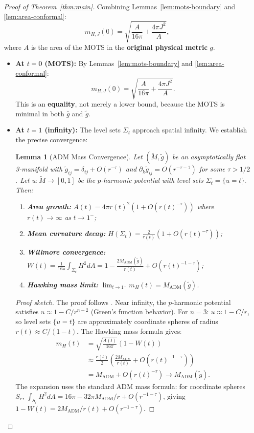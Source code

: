 \documentclass[12pt]{article}
\theoremstyle{plain}
\newtheorem{lemma}[theorem]{Lemma}
\theoremstyle{definition}
\theoremstyle{remark}
\newcommand{\ADM}{\mathrm{ADM}}
\newcommand{\tM}{\tilde{M}}
\newcommand{\tg}{\tilde{g}}
\newcommand{\bg}{\bar{g}}
\begin{document}
\begin{proof}[Proof of Theorem~\ref{thm:main}]
Combining Lemmas~\ref{lem:mots-boundary} and \ref{lem:area-conformal}:
\[
m_{H,J}(0) = \sqrt{\frac{A}{16\pi} + \frac{4\pi J^2}{A}},
\]
where $A$ is the area of the MOTS in the \textbf{original physical metric} $g$.

\begin{itemize}
    \item \textbf{At $t = 0$ (MOTS):} By Lemmas~\ref{lem:mots-boundary} and \ref{lem:area-conformal}:
    \[
    m_{H,J}(0) = \sqrt{\frac{A}{16\pi} + \frac{4\pi J^2}{A}}.
    \]
    This is an \textbf{equality}, not merely a lower bound, because the MOTS is minimal in both $\bg$ and $\tg$.
    
    \item \textbf{At $t = 1$ (infinity):} The level sets $\Sigma_t$ approach spatial infinity. We establish the precise convergence:
    
    \begin{lemma}[ADM Mass Convergence]\label{lem:adm-convergence}
    Let $(\tM, \tg)$ be an asymptotically flat 3-manifold with $\tg_{ij} = \delta_{ij} + O(r^{-\tau})$ and $\partial_k \tg_{ij} = O(r^{-\tau-1})$ for some $\tau > 1/2$. Let $u: \tM \to [0,1]$ be the $p$-harmonic potential with level sets $\Sigma_t = \{u = t\}$. Then:
    \begin{enumerate}[label=\textup{(\roman*)}]
        \item \textbf{Area growth:} $A(t) = 4\pi r(t)^2(1 + O(r(t)^{-\tau}))$ where $r(t) \to \infty$ as $t \to 1^-$;
        \item \textbf{Mean curvature decay:} $H(\Sigma_t) = \frac{2}{r(t)}(1 + O(r(t)^{-\tau}))$;
        \item \textbf{Willmore convergence:} $W(t) = \frac{1}{16\pi}\int_{\Sigma_t} H^2 dA = 1 - \frac{2M_{\ADM}(\tg)}{r(t)} + O(r(t)^{-1-\tau})$;
        \item \textbf{Hawking mass limit:} $\displaystyle\lim_{t \to 1^-} m_H(t) = M_{\ADM}(\tg)$.
    \end{enumerate}
    \end{lemma}
    
    \begin{proof}[Proof sketch]
    The proof follows \cite[Theorem 1.3]{amo2022}. Near infinity, the $p$-harmonic potential satisfies $u \approx 1 - C/r^{n-2}$ (Green's function behavior). For $n = 3$: $u \approx 1 - C/r$, so level sets $\{u = t\}$ are approximately coordinate spheres of radius $r(t) \approx C/(1-t)$. The Hawking mass formula gives:
    \begin{align*}
    m_H(t) &= \sqrt{\frac{A(t)}{16\pi}}\left(1 - W(t)\right) \\
    &\approx \frac{r(t)}{2}\left(\frac{2M_{\ADM}}{r(t)} + O(r(t)^{-1-\tau})\right) \\
    &= M_{\ADM} + O(r(t)^{-\tau}) \to M_{\ADM}(\tg).
    \end{align*}
    The expansion uses the standard ADM mass formula: for coordinate spheres $S_r$, $\int_{S_r} H^2 dA = 16\pi - 32\pi M_{\ADM}/r + O(r^{-1-\tau})$, giving $1 - W(t) = 2M_{\ADM}/r(t) + O(r^{-1-\tau})$.
    \end{proof}
    

\end{itemize}
\end{proof}
\end{document}
